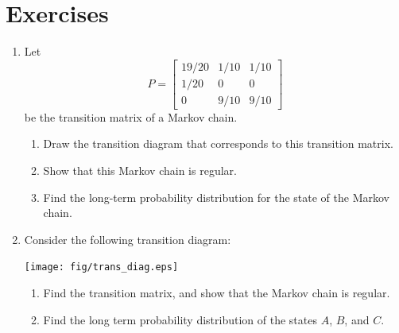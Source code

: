 \documentclass[reqno]{immbook}
\begin{document}
\section{Exercises}
\label{sec:exercises_markov}
\begin{enumerate}
\item
\label{ex:markov1}
Let
\begin{equation}
  P = \begin{bmatrix}
           19/20 & 1/10 & 1/10 \\
	   1/20 & 0   & 0   \\
	   0    & 9/10 & 9/10
      \end{bmatrix}
\end{equation}
be the transition matrix of a Markov chain.
\begin{enumerate}
\item
Draw the transition diagram that corresponds to this transition matrix.
\item
Show that this Markov chain is regular.
\item
Find the long-term probability distribution for the state of the Markov
chain.
\end{enumerate}

\item
\label{ex:markov2}
Consider the following transition diagram:

\medskip
\centerline{%
\texttt{[image: fig/trans\_diag.eps]}
}
\begin{enumerate}
\item Find the transition matrix,
and show that the Markov chain is regular.
\item  Find the long term probability distribution of the states
$A$, $B$, and $C$.
\end{enumerate}



\end{enumerate}
\end{document}
